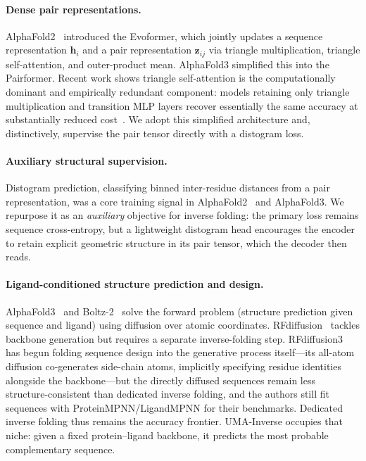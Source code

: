 \documentclass[11pt,letterpaper]{article}
\newcommand{\bz}{\mathbf{z}}
\newcommand{\bh}{\mathbf{h}}
\begin{document}
\paragraph{Dense pair representations.}
AlphaFold2~\citep{jumper2021alphafold} introduced the Evoformer, which jointly updates a sequence
representation $\bh_i$ and a pair representation $\bz_{ij}$ via triangle multiplication, triangle
self-attention, and outer-product mean. AlphaFold3 simplified this into the Pairformer. Recent work
shows triangle self-attention is the computationally dominant and empirically redundant component:
models retaining only triangle multiplication and transition MLP layers recover essentially the same
accuracy at substantially reduced cost~\citep{ouyangzhang2025pairmixer}. We adopt this simplified architecture and,
distinctively, supervise the pair tensor directly with a distogram loss.

\paragraph{Auxiliary structural supervision.}
Distogram prediction, classifying binned inter-residue distances from a pair
representation, was a core training signal in AlphaFold2~\citep{jumper2021alphafold} and AlphaFold3.
We repurpose it as an \emph{auxiliary} objective for inverse folding: the primary loss remains
sequence cross-entropy, but a lightweight distogram head encourages the encoder to retain explicit
geometric structure in its pair tensor, which the decoder then reads.

\paragraph{Ligand-conditioned structure prediction and design.}
AlphaFold3~\citep{abramson2024alphafold3} and Boltz-2~\citep{passaro2025boltz2} solve the forward
problem (structure prediction given sequence and ligand) using diffusion over atomic coordinates.
RFdiffusion~\citep{watson2023rfdiffusion} tackles backbone generation but requires a separate inverse-folding
step. RFdiffusion3~\citep{butcher2025rfdiffusion3} has begun folding sequence design into the generative
process itself---its all-atom diffusion co-generates side-chain atoms, implicitly specifying residue
identities alongside the backbone---but the directly diffused sequences remain less structure-consistent
than dedicated inverse folding, and the authors still fit sequences with ProteinMPNN/LigandMPNN for
their benchmarks. Dedicated inverse folding thus remains the accuracy frontier. UMA-Inverse occupies that
niche: given a fixed protein--ligand backbone, it predicts the most probable complementary sequence.
\end{document}
